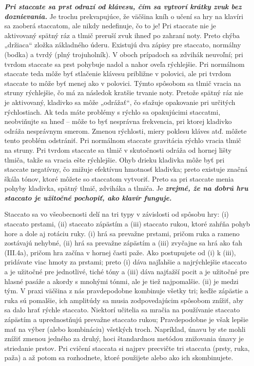 \documentclass[11pt,a4paper%
]{book}
\begin{document}
\emph{\textbf{Pri staccate sa prst odrazí od klávesu, čím sa vytvorí krátky zvuk bez doznievania.}} Je trochu prekvapujúce, že väčšina kníh o učení sa hry na klavíri sa zaoberá staccatom, ale nikdy nedefinuje, čo to je! Pri staccate nie je aktivovaný spätný ráz a tlmič preruší zvuk ihneď po zahraní noty. Preto chýba „držiaca`` zložka základného úderu. Existujú dva zápisy pre staccato, normálny (bodka) a tvrdý (plný trojuholník). V oboch prípadoch sa zdvihák neuvoľní; pri tvrdom staccate sa prst pohybuje nadol a nahor oveľa rýchlejšie. Pri normálnom staccate teda môže byť stlačenie klávesu približne v polovici, ale pri tvrdom staccate to môže byť menej ako v polovici. Týmto spôsobom sa tlmič vracia na struny rýchlejšie, čo má za následok kratšie trvanie noty. Pretože spätný ráz nie je aktivovaný, kladivko sa môže „odrážať``, čo sťažuje opakovanie pri určitých rýchlostiach. Ak teda máte problémy s rýchlo sa opakujúcimi staccatmi, neobviňujte sa hneď -- môže to byť nesprávna frekvencia, pri ktorej kladivko odráža nesprávnym smerom. Zmenou rýchlosti, miery poklesu kláves atď. môžete tento problém odstrániť. Pri normálnom staccate gravitácia rýchlo vracia tlmič na struny. Pri tvrdom staccate sa tlmič v skutočnosti odráža od hornej lišty tlmiča, takže sa vracia ešte rýchlejšie. Ohyb drieku kladivka môže byť pri staccate negatívny, čo znižuje efektívnu hmotnosť kladivka; preto existuje značná škála tónov, ktoré môžete so staccatom vytvoriť. Preto sa pri staccate menia pohyby kladivka, spätný tlmič, zdviháka a tlmiča. Je \emph{\textbf{zrejmé, že na dobrú hru staccato je užitočné pochopiť, ako klavír funguje.}}

Staccato sa vo všeobecnosti delí na tri typy v závislosti od spôsobu hry: (i) staccato prstami, (ii) staccato zápästím a (iii) staccato rukou, ktoré zahŕňa pohyb hore a dole aj rotáciu ruky. (i) hrá sa prevažne prstami, pričom ruka a rameno zostávajú nehybné, (ii) hrá sa prevažne zápästím a (iii) zvyčajne sa hrá ako ťah (III.4a), pričom hra začína v hornej časti paže. Ako postupujete od (i) k (iii), pridávate viac hmoty za prstami; preto (i) dáva najľahšie a najrýchlejšie staccato a je užitočné pre jednotlivé, tiché tóny a (iii) dáva najťažší pocit a je užitočné pre hlasné pasáže a akordy s mnohými tónmi, ale je tiež najpomalšie. (ii) je medzi tým. V praxi väčšina z nás pravdepodobne kombinuje všetky tri; keďže zápästie a ruka sú pomalšie, ich amplitúdy sa musia zodpovedajúcim spôsobom znížiť, aby sa dalo hrať rýchle staccato. Niektorí učitelia sa mračia na používanie staccato zápästím a uprednostňujú prevažne staccato rukou; Pravdepodobne je však lepšie mať na výber (alebo kombináciu) všetkých troch. Napríklad, únavu by ste mohli znížiť zmenou jedného za druhý, hoci štandardnou metódou znižovania únavy je striedanie prstov. Pri cvičení staccata si najprv precvičte tri staccata (prsty, ruka, paža) a až potom sa rozhodnete, ktoré použijete alebo ako ich skombinujete.
\end{document}
